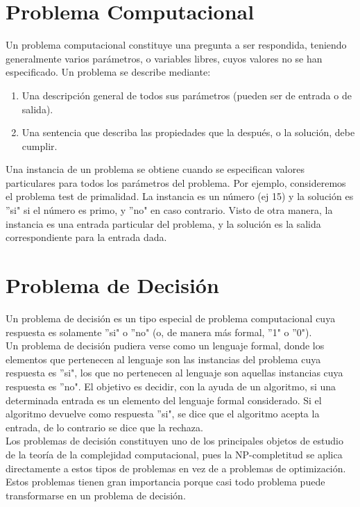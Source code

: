 \documentclass[12pt]{report}
\begin{document}
\section{Problema Computacional}%
Un problema computacional constituye una pregunta a ser respondida, teniendo generalmente varios parámetros, o variables libres, cuyos valores no se han especificado. Un problema se describe mediante:
\begin{enumerate}
\item Una descripción general de todos sus parámetros (pueden ser de entrada o de salida).
\item Una sentencia que describa las propiedades que la después, o la solución, debe cumplir.
\end{enumerate}
Una instancia de un problema se obtiene cuando se especifican valores particulares para todos los parámetros del problema. Por ejemplo, consideremos el problema test de primalidad. La instancia es un número (ej 15) y la solución es ''si" si el número es primo, y ''no" en caso contrario. Visto de otra manera, la instancia es una entrada particular del problema, y la solución es la salida correspondiente para la entrada dada.

\section{Problema de Decisión}
Un problema de decisión es un tipo especial de problema computacional cuya respuesta es solamente ''si" o ''no" (o, de manera más formal, ''1" o ''0").\\
Un problema de decisión pudiera verse como un lenguaje formal, donde los elementos que pertenecen al lenguaje son las instancias del problema cuya respuesta es ''si", los que no pertenecen al lenguaje son aquellas instancias cuya respuesta es ''no". El objetivo es decidir, con la ayuda de un algoritmo, si una determinada entrada es un elemento del lenguaje formal considerado. Si el algoritmo devuelve como respuesta ''si", se dice que el algoritmo acepta la entrada, de lo contrario se dice que la rechaza.\\
Los problemas de decisión constituyen uno de los principales objetos de estudio de la teoría de la complejidad computacional, pues la NP-completitud se aplica directamente a estos tipos de problemas en vez de a problemas de optimización. Estos problemas tienen gran importancia porque casi todo problema puede transformarse en un problema de decisión.
\end{document}
